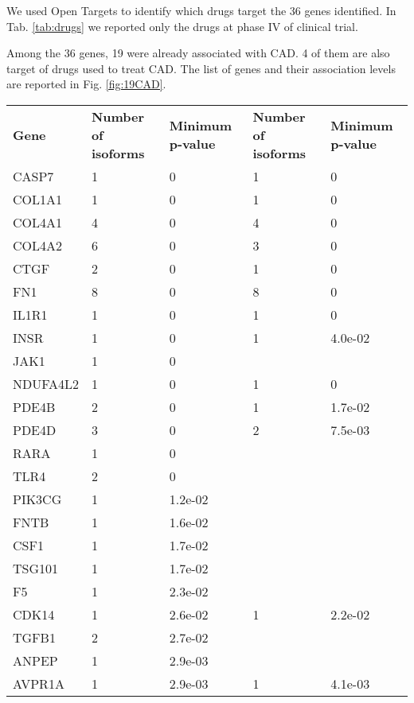 \documentclass[fleqn,10pt]{SelfArx} %
\begin{document}
We used Open Targets to identify which drugs target the 36 genes identified. In Tab. \ref{tab:drugs} we reported only the drugs at phase IV of clinical trial.

Among the 36 genes, 19 were already associated with CAD. 4 of them are also target of drugs used to treat CAD. The list of genes and their association levels are reported in Fig. \ref{fig:19CAD}.

\renewcommand{\arraystretch}{1.1}

\begin{table}[!htb]
	\centering
	\begin{tabularx}{\linewidth}{XRRRR}
		\textbf{\color{white} Gene} & \textbf{\color{white} Number of isoforms} & \textbf{\color{white} Minimum p-value} & \textbf{\color{white} Number of isoforms} & \textbf{\color{white} Minimum p-value} \\ 
		CASP7 & 1 & 0 & 1 & 0 \\ 
		COL1A1 & 1 & 0 & 1 & 0 \\ 
		COL4A1 & 4 & 0 & 4 & 0 \\ 
		COL4A2 & 6 & 0 & 3 & 0 \\ 
		CTGF & 2 & 0 & 1 & 0 \\ 
		FN1 & 8 & 0 & 8 & 0 \\ 
		IL1R1 & 1 & 0 & 1 & 0 \\ 
		INSR & 1 & 0 & 1 & 4.0e-02 \\ 
		JAK1 & 1 & 0 &  &  \\ 
		NDUFA4L2 & 1 & 0 & 1 & 0 \\ 
		PDE4B & 2 & 0 & 1 & 1.7e-02 \\ 
		PDE4D & 3 & 0 & 2 & 7.5e-03 \\ 
		RARA & 1 & 0 &  &  \\ 
		TLR4 & 2 & 0 &  &  \\ 
		PIK3CG & 1 & 1.2e-02 &  &  \\ 
		FNTB & 1 & 1.6e-02 &  &  \\ 
		CSF1 & 1 & 1.7e-02 &  &  \\ 
		TSG101 & 1 & 1.7e-02 &  &  \\ 
		F5 & 1 & 2.3e-02 &  &  \\ 
		CDK14 & 1 & 2.6e-02 & 1 & 2.2e-02 \\ 
		TGFB1 & 2 & 2.7e-02 &  &  \\ 
		ANPEP & 1 & 2.9e-03 &  &  \\ 
		AVPR1A & 1 & 2.9e-03 & 1 & 4.1e-03 \\ 

\end{tabularx}
\end{table}
\end{document}
